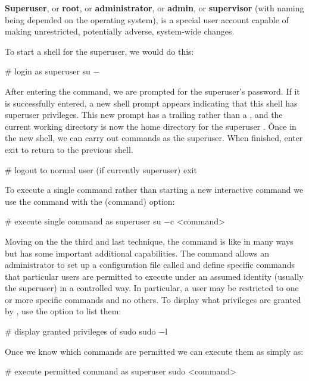\textbf{Superuser}, or \textbf{root}, or \textbf{administrator}, or \textbf{admin}, or \textbf{supervisor} (with naming
being depended on the operating system), is a special user account capable of making unrestricted, potentially adverse,
system-wide changes.
\ed

To start a shell for the superuser, we would do this:
\begin{bash}
# login as superuser
su $-$
\end{bash}

After entering the command, we are prompted for the superuser's password. If it is successfully entered, a new shell
prompt appears indicating that this shell has superuser privileges. This new prompt has a trailing \code{$\#$} rather
than
a \code{$\$$}, and the current working directory is now the home directory for the superuser . \v

Once in the new shell, we can carry out commands as the superuser. When finished, enter exit to return to the previous
shell.
\begin{bash}
# logout to normal user (if currently superuser)
exit
\end{bash}

To execute a single command rather than starting a new interactive command we use the  command with the
 (command) option:
\begin{bash}
# execute single command as superuser
su $-$c <command>
\end{bash}

Moving on the the third and last technique, the  command is like  in many ways but has some
important additional capabilities. The  command allows an administrator to set up a configuration file
called  and define specific commands that particular users are permitted to execute under an
assumed identity (usually the superuser) in a controlled way. In particular, a user may be restricted to one or more
specific commands and no others. To display what privileges are granted by , use the  option to
list them:
\begin{bash}
# display granted privileges of sudo
sudo $-$l
\end{bash}

Once we know which commands are permitted we can execute them as simply as:
\begin{bash}
# execute permitted command as superuser
sudo <command>
\end{bash}

